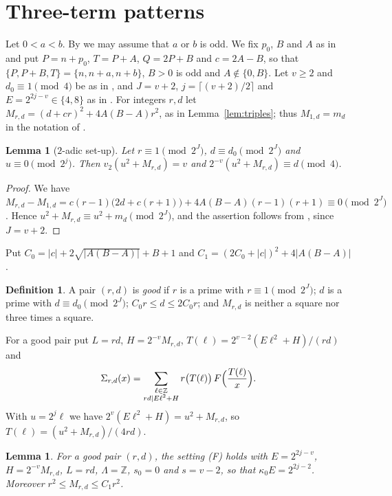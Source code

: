 \documentclass[11pt]{amsart}
\newtheorem{lemma}[theorem]{Lemma}
\theoremstyle{remark}
\theoremstyle{definition}
\newtheorem{definition}[theorem]{Definition}
\numberwithin{equation}{section}
\newcommand{\Z}{\mathbb{Z}}
\begin{document}
\section{Three-term patterns}\label{sec:triples}

Let $0<a<b$. By \cite[Lemma~2.1]{IC} we may assume that $a$ or $b$ is odd. We fix $p_0$, $B$ and $A$ as in \cite[Lemma~2.3]{IC} and put $P=n+p_0$, $T=P+A$, $Q=2P+B$ and $c=2A-B$, so that $\{P,P+B,T\}=\{n,n+a,n+b\}$, $B>0$ is odd and $A\notin\{0,B\}$. Let $v\ge2$ and $d_0\equiv1\pmod 4$ be as in \cite[Proposition~3.2]{IC}, and $J=v+2$, $j=\lceil(v+2)/2\rceil$ and $E=2^{2j-v}\in\{4,8\}$ as in \cite[(4.1)]{IC}. For integers $r,d$ let $M_{r,d}=(d+cr)^2+4A(B-A)r^2$, as in Lemma~\ref{lem:triples}; thus $M_{1,d}=m_d$ in the notation of \cite{IC}.

\begin{lemma}[$2$-adic set-up]\label{lem:2adic-triples}
Let $r\equiv1\pmod{2^J}$, $d\equiv d_0\pmod{2^J}$ and $u\equiv0\pmod{2^j}$. Then $v_2(u^2+M_{r,d})=v$ and $2^{-v}(u^2+M_{r,d})\equiv d\pmod 4$.
\end{lemma}

\begin{proof}
We have $M_{r,d}-M_{1,d}=c(r-1)\bigl(2d+c(r+1)\bigr)+4A(B-A)(r-1)(r+1)\equiv0\pmod{2^J}$. Hence $u^2+M_{r,d}\equiv u^2+m_d\pmod{2^J}$, and the assertion follows from \cite[Proposition~3.2]{IC}, since $J=v+2$.
\end{proof}

Put $C_0=|c|+2\sqrt{|A(B-A)|}+B+1$ and $C_1=(2C_0+|c|)^2+4|A(B-A)|$.

\begin{definition}\label{def:goodtriples}
A pair $(r,d)$ is \emph{good} if $r$ is a prime with $r\equiv1\pmod{2^J}$; $d$ is a prime with $d\equiv d_0\pmod{2^J}$; $C_0r\le d\le2C_0r$; and $M_{r,d}$ is neither a square nor three times a square.
\end{definition}

For a good pair put $L=rd$, $H=2^{-v}M_{r,d}$, $T(\ell)=2^{v-2}(E\ell^2+H)/(rd)$ and
\[
\Sigma_{r,d}(x)=\sum_{\substack{\ell\in\Z\\ rd\mid E\ell^2+H}}r\bigl(T(\ell)\bigr)\,F\Bigl(\frac{T(\ell)}x\Bigr).
\]
With $u=2^j\ell$ we have $2^v(E\ell^2+H)=u^2+M_{r,d}$, so $T(\ell)=(u^2+M_{r,d})/(4rd)$.

\begin{lemma}\label{lem:Ftriples}
For a good pair $(r,d)$, the setting \textup{(F)} holds with $E=2^{2j-v}$, $H=2^{-v}M_{r,d}$, $L=rd$, $\Lambda=\Z$, $s_0=0$ and $s=v-2$, so that $\kappa_0E=2^{2j-2}$. Moreover $r^2\le M_{r,d}\le C_1r^2$.
\end{lemma}
\end{document}
